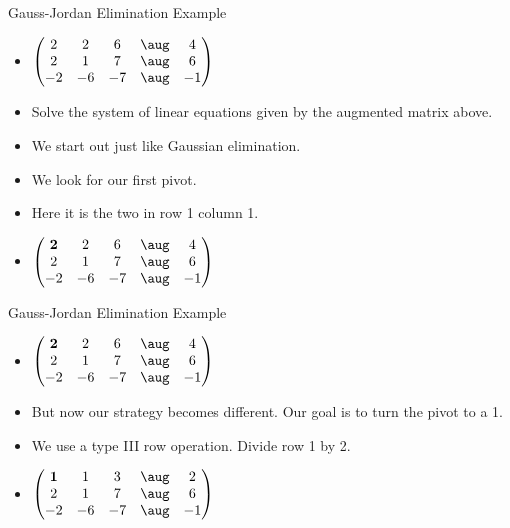 \documentclass{beamer}
\begin{document}
\begin{frame}{Gauss-Jordan Elimination Example}

\begin{itemize}
\item $
\begin{pmatrix}
        2 &   2   &   6    &  \aug &    4 \\
        2  &   1   &   7    &  \aug &    6  \\
       -2  &  -6   &  -7    &  \aug &   -1  \\
\end{pmatrix}
$
\item Solve the system of linear equations given by the augmented matrix above.
\item We start out just like Gaussian elimination.
\item We look for our first pivot.
\item Here it is the two in row 1 column 1.
\item $
\begin{pmatrix}
    \bf{2} &   2   &   6    &  \aug &    4 \\
        2  &   1   &   7    &  \aug &    6  \\
       -2  &  -6   &  -7    &  \aug &   -1  \\
\end{pmatrix}
$
\end{itemize}
\end{frame}


\begin{frame}{Gauss-Jordan Elimination Example}

\begin{itemize}
\item $
\begin{pmatrix}
\bf{2} &   2   &   6    &  \aug &    4 \\
        2  &   1   &   7    &  \aug &    6  \\
       -2  &  -6   &  -7    &  \aug &   -1  \\
\end{pmatrix}
$
\item But now our strategy becomes different. Our goal is to turn the pivot to a 1.
\item We use a type III row operation. Divide row 1 by 2.
\item $
\begin{pmatrix}
\bf{1} &   1   &   3    &  \aug &    2 \\
        2  &   1   &   7    &  \aug &    6  \\
       -2  &  -6   &  -7    &  \aug &   -1  \\
\end{pmatrix}
$
\end{itemize}
\end{frame}
\end{document}
